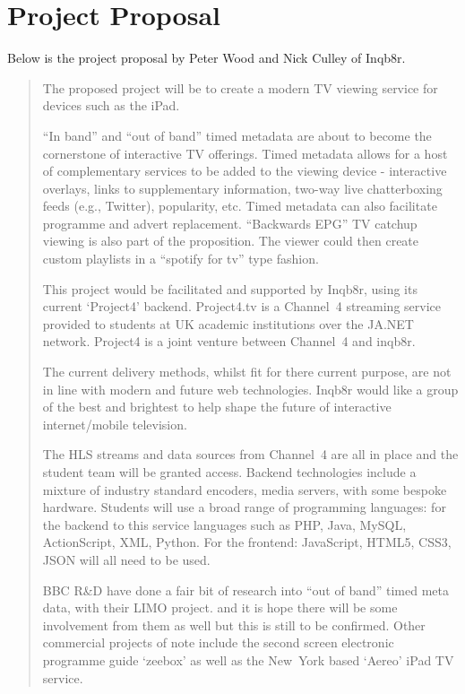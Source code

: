 \section{Project Proposal}
\label{sec:inqb8r_proposal}

Below is the project proposal by Peter Wood and Nick Culley of Inqb8r.

\begin{quotation}
\noindent The proposed project will be to create a modern TV viewing service for devices such as the iPad. 

``In band'' and ``out of band'' timed metadata are about to become the cornerstone of interactive TV offerings. Timed metadata allows for a host of complementary services to be added to the viewing device - interactive overlays, links to supplementary information, two-way live chatterboxing feeds (e.g., Twitter), popularity, etc. Timed metadata can also facilitate programme and advert replacement. ``Backwards EPG'' TV catchup viewing is also part of the proposition. The viewer could then create custom playlists in a ``spotify for tv'' type fashion.  

This project would be facilitated and supported by Inqb8r, using its current `Project4' backend. Project4.tv is a Channel~4 streaming service provided to students at UK academic institutions over the JA.NET network. Project4 is a joint venture between Channel~4 and inqb8r.

The current delivery methods, whilst fit for there current purpose, are not in line with modern and future web technologies. Inqb8r would like a group of the best and brightest to help shape the future of interactive internet/mobile television.

The HLS streams and data sources from Channel~4 are all in place and the student team will be granted access. Backend technologies include a mixture of industry standard encoders, media servers, with some bespoke hardware. Students will use a broad range of programming languages: for the backend to this service languages such as PHP, Java, MySQL, ActionScript, XML, Python. For the frontend: JavaScript, HTML5, CSS3, JSON will all need to be used.

BBC R\&D have done a fair bit of research into ``out of band'' timed meta data, with their LIMO project. and it is hope there will be some involvement from them as well but this is still to be confirmed. Other commercial projects of note include the second screen electronic programme guide `zeebox' as well as the New~York based `Aereo' iPad TV service.


\end{quotation}

